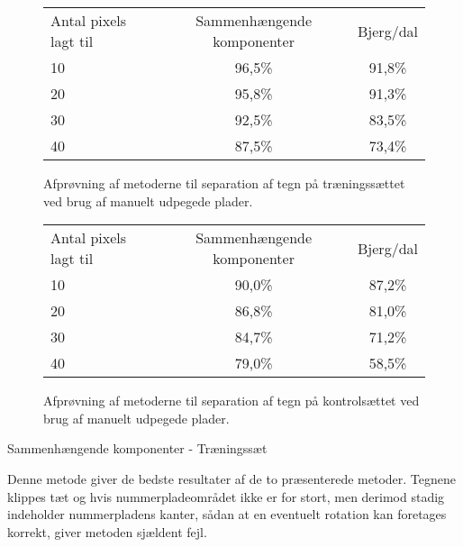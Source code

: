 \begin{figure}[htp]
\centering
\begin{tabular}{|l|c|c|}\hline
\rowcolor[gray]{0.9} \multicolumn{3}{|>{\columncolor[gray]{0.9}}c|}{\textbf{Træningssæt}} \\ \hline
Antal pixels lagt til & Sammenhængende komponenter & Bjerg/dal \\\hline
10 & 96,5\% & 91,8\% \\\hline
20 & 95,8\% & 91,3\% \\\hline
30 & 92,5\% & 83,5\% \\\hline
40 & 87,5\% & 73,4\% \\\hline \end{tabular}
\caption{Afprøvning af metoderne til separation af tegn på træningssættet ved brug af manuelt udpegede plader.}
\label{fig:test:sep-traening-manuel}
\end{figure}

\begin{figure}[htp]
\centering
\begin{tabular}{|l|c|c|}\hline
\rowcolor[gray]{0.9} \multicolumn{3}{|>{\columncolor[gray]{0.9}}c|}{\textbf{Kontrolsæt}} \\ \hline
Antal pixels lagt til & Sammenhængende komponenter & Bjerg/dal \\\hline
10 & 90,0\% & 87,2\% \\\hline
20 & 86,8\% & 81,0\% \\\hline
30 & 84,7\% & 71,2\% \\\hline
40 & 79,0\% & 58,5\% \\\hline \end{tabular}
\caption{Afprøvning af metoderne til separation af tegn på kontrolsættet ved brug af manuelt udpegede plader.}
\label{fig:test:sep-kontrol-manuel}
\end{figure}


Sammenhængende komponenter - Træningssæt

Denne metode giver de bedste resultater af de to præsenterede metoder. Tegnene klippes tæt og hvis nummerpladeområdet ikke er for stort, men derimod stadig indeholder nummerpladens kanter, sådan at en eventuelt rotation kan foretages korrekt, giver metoden sjældent fejl.

